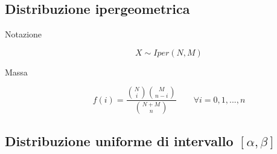 \begin{description}


\end{description}


\subsection{Distribuzione ipergeometrica}

\begin{description}
	
	\item [Notazione]
		\begin{equation}
		X \sim Iper(N,M)
		\end{equation}

	\item [Massa]
		\begin{equation}
		f(i) = \frac{\binom{N}{i}\binom{M}{n-i}}{\binom{N+M}{n}} \qquad\forall i=0,1,...,n
		\end{equation}

\end{description}


\subsection{Distribuzione uniforme di intervallo $[\alpha,\beta]$}

